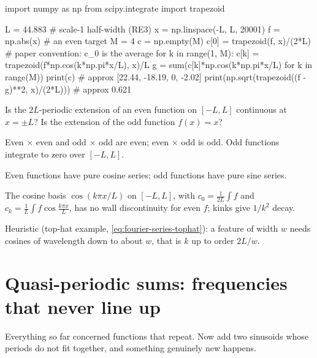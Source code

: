 \begin{pycode}
import numpy as np
from scipy.integrate import trapezoid

L = 44.883                      # scale-1 half-width (RE3)
x = np.linspace(-L, L, 20001)
f = np.abs(x)                   # an even target
M = 4
c = np.empty(M)
c[0] = trapezoid(f, x)/(2*L)    # paper convention: c_0 is the average
for k in range(1, M):
    c[k] = trapezoid(f*np.cos(k*np.pi*x/L), x)/L
g = sum(c[k]*np.cos(k*np.pi*x/L) for k in range(M))
print(c)                        # approx [22.44, -18.19, 0, -2.02]
print(np.sqrt(trapezoid((f - g)**2, x)/(2*L)))   # approx 0.621
\end{pycode}

\begin{checkpoint}
Is the $2L$-periodic extension of an even function on $[-L,L]$ continuous at $x=\pm L$? Is the extension of the odd function $f(x)=x$?
\end{checkpoint}

\begin{keyideas}
\item Even $\times$ even and odd $\times$ odd are even; even $\times$ odd is odd. Odd functions integrate to zero over $[-L,L]$.
\item Even functions have pure cosine series; odd functions have pure sine series.
\item The cosine basis $\cos(k\pi x/L)$ on $[-L,L]$, with $c_0=\frac1{2L}\int f$ and $c_k=\frac1L\int f\cos\frac{k\pi x}{L}$, has no wall discontinuity for even $f$; kinks give $1/k^2$ decay.
\item Heuristic (top-hat example, \cref{eq:fourier-series-tophat}): a feature of width $w$ needs cosines of wavelength down to about $w$, that is $k$ up to order $2L/w$.
\end{keyideas}

\section{Quasi-periodic sums: frequencies that never line up}\label{sec:fourier-series-quasi}

Everything so far concerned functions that repeat. Now add two sinusoids whose periods do not fit together, and something genuinely new happens.

